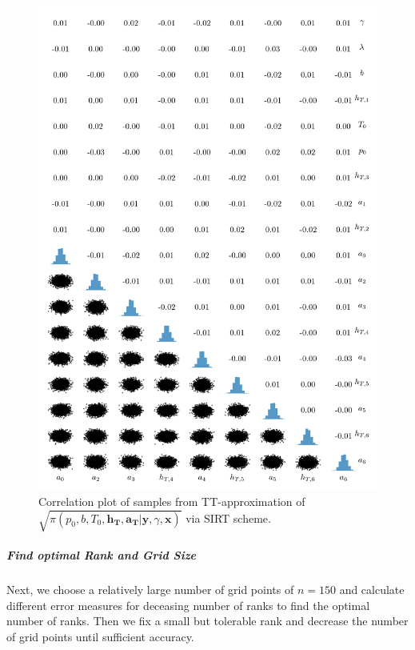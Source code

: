 \begin{figure}%
	\includegraphics[]{2ndCorrPlot.png}
	\caption*{Correlation plot of samples from TT-approximation of $\sqrt{\pi(p_0,b,T_0,\bm{h_T},\bm{a_T} | \bm{y}, \gamma, \bm{x})}$ via SIRT scheme.}
\end{figure}
\cleardoublepage


\subparagraph{Find optimal Rank and Grid Size}
Next, we choose a relatively large number of grid points of $n = 150$ and calculate different error measures for deceasing number of ranks to find the optimal number of ranks.
Then we fix a small but tolerable rank and decrease the number of grid points until sufficient accuracy.


